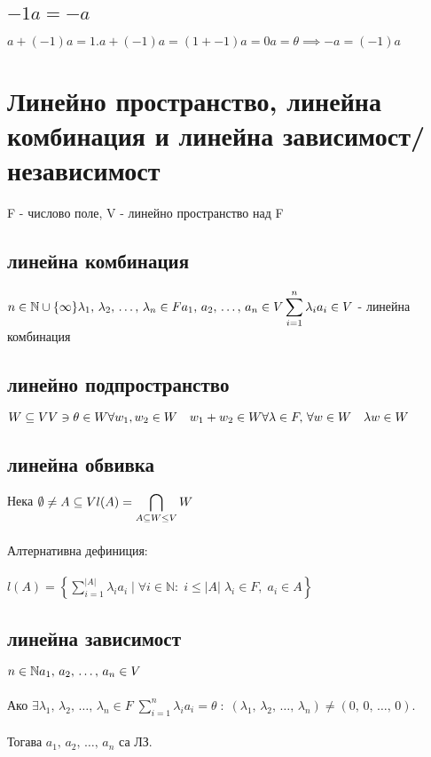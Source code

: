 \documentclass[12pt]{article}
\begin{document}
    \subsection{\(-1a = -a\)}
    \(a + (-1)a = 1.a + (-1)a = (1 + -1)a = 0a = \theta \implies -a = (-1)a\)
    \section{Линейно пространство, линейна комбинация и линейна зависимост/независимост}
    F - числово поле, V - линейно пространство над F
    \subsection{линейна комбинация}
    \(n \in \mathbb{N} \cup \{\infty\}\\\\
    \lambda_1, \, \lambda_2, \, \dots, \, \lambda_n \in F \\\\
    a_1, \, a_2, \, \dots, \, a_n \in V \\\\
    \displaystyle\sum_{i=1}^{n} \lambda_i a_i \in V\) - линейна комбинация
    \subsection{линейно подпространство}
    \(W \subseteq V\\\\
    V \ni \theta \in W \\\\ 
    \forall w_1, w_2 \in W \quad w_1 + w_2 \in W \\\\
    \forall \lambda \in F, \, \forall w \in W \quad \lambda w \in W\)
    \subsection{линейна обвивка}
    Нека \(\emptyset \neq A \subseteq V\\\\
    l(A) = \displaystyle\bigcap_{A \subseteq W \leq V} W\) \\\\
    Алтернативна дефиниция: \\\\
    \(l(A) = \left\{ \displaystyle\sum_{i = 1}^{|A|} \lambda_i a_i \; | \; \forall i \in \mathbb{N} : \; i \leq |A| \; \lambda_i \in F, \; a_i \in A \right \}\)
    \subsection{линейна зависимост}
    \(n \in \mathbb{N}\\\\
    a_1, \, a_2, \, \dots, \, a_n \in V\)\\\\
    Ако \(\exists \lambda_1, \, \lambda_2, \, \dots, \, \lambda_n \in F \; \displaystyle\sum_{i=1}^{n} \lambda_i a_i = \theta \; : \; (\lambda_1, \, \lambda_2, \, \dots, \, \lambda_n) \neq (0, \, 0, \, \dots, \, 0)\). \\\\
    Тогава \(a_1, \, a_2, \, \dots, \, a_n\) са ЛЗ.
\end{document}
